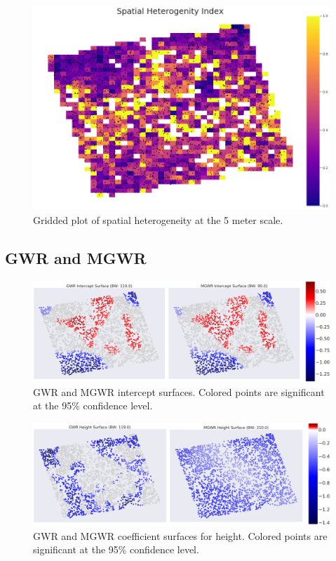 \documentclass[12pt,a4paper]{article}
\begin{document}
\begin{figure}[H]
\centering
\includegraphics[scale=.45]{../figures/ESDA_shi.png}
\caption{Gridded plot of spatial heterogeneity at the 5 meter scale.}
\label{ESDA_shi} 
\end{figure}



\subsection{GWR and MGWR}


\begin{figure}[H]
\centering
\includegraphics[scale=.13]{../figures/GWR_intercept.png}
\caption{GWR and MGWR intercept surfaces.  Colored points are significant at the 95\% confidence level.}
\label{GWR_intercept} 
\end{figure}


\begin{figure}[H]
\centering
\includegraphics[scale=.13]{../figures/GWR_height.png}
\caption{GWR and MGWR coefficient surfaces for height.  Colored points are significant at the 95\% confidence level.}
\label{GWR_height} 
\end{figure}
\end{document}

